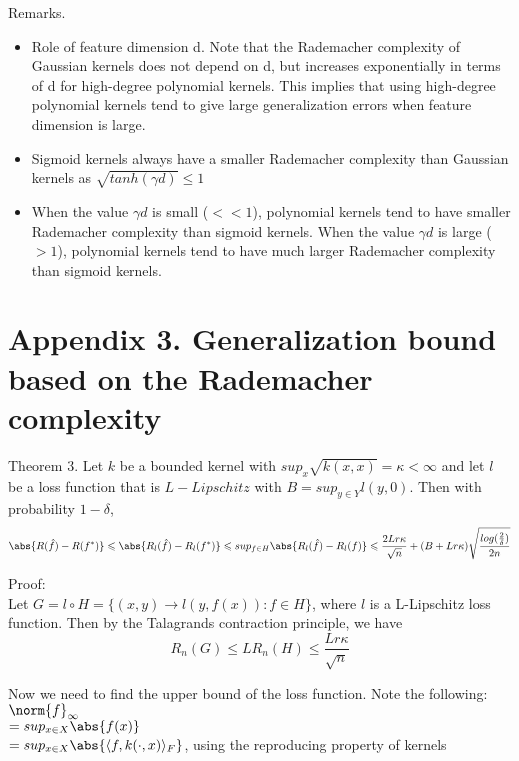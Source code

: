 \documentclass{article}
\begin{document}
Remarks.
\begin{itemize}
  \item Role of feature dimension d. Note that the Rademacher complexity of Gaussian kernels does not depend on d, but increases exponentially in terms of d for high-degree polynomial kernels. This implies that using high-degree polynomial kernels tend to give large generalization errors when feature dimension is large. 
  
  \item Sigmoid kernels always have a smaller Rademacher complexity than Gaussian kernels as $\sqrt{tanh(\gamma  d)} \leqslant 1$

  \item When the value $\gamma d$ is small ($<<1$), polynomial kernels tend to have smaller Rademacher complexity than sigmoid kernels. When the value $\gamma d$ is large ($>1$), polynomial kernels tend to have much larger Rademacher complexity than sigmoid kernels.
  
\end{itemize}

\section*{Appendix 3. Generalization bound based on the Rademacher complexity} 
Theorem 3. Let $k$ be a bounded kernel with $sup_x\sqrt{k(x,x)}=\kappa<\infty$ and let $l$ be a loss function that is $L-Lipschitz$ with $B=sup_{y\in Y} l(y,0)$. Then with probability $1-\delta$, $$\abs{R(\hat{f})-R(f^*)} \leqslant \abs{R_{l}(\hat{f})-R_{l}(f^*)} \leqslant sup_{f\in H}\abs{R_{l}(\hat{f})-R_{l}(f)} \leqslant \frac{2Lr\kappa}{\sqrt{n}} + (B+Lr\kappa) \sqrt{ \frac{ log(\frac{2}{\delta})}{2n} }$$

Proof: \\
Let $G=l \circ H = \{(x,y) \rightarrow l(y,f(x)): f \in H \}$, where $l$ is a L-Lipschitz loss function. Then by the Talagrands contraction principle, we have $$R_n(G) \leqslant LR_n(H) \leqslant \frac{Lr\kappa}{\sqrt{n}}$$

Now we need to find the upper bound of the loss function. Note the following: \\
$\norm{f}_{\infty}$ \\

$= sup_{x \in X} \abs{f(x)}$\\

$= sup_{x \in X} \abs{\langle f,k(\cdot,x) \rangle_{F}}$, using the reproducing property of kernels\\
\end{document}
